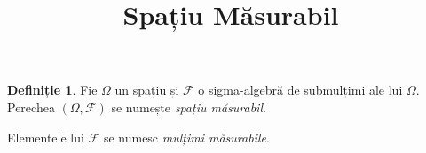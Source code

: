 \documentclass[12pt]{article}
\title{Spațiu Măsurabil}
\author{}
\date{}
\theoremstyle{definition}
\newtheorem{definition}{Definiție}
\begin{document}
\maketitle

\begin{definition}
Fie $\Omega$ un spațiu și $\mathcal{F}$ o sigma-algebră de submulțimi ale lui $\Omega$. 
Perechea $(\Omega, \mathcal{F})$ se numește \emph{spațiu măsurabil}.
\end{definition}

\noindent
Elementele lui $\mathcal{F}$ se numesc \emph{mulțimi măsurabile}.
\end{document}
